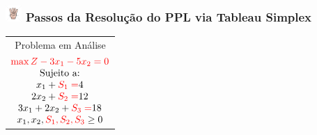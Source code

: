 \begin{frame}
	\frametitle{\includegraphics[width=0.6cm,height=0.6cm]{number_4.jpg} \hspace{0.2cm} Passos da Resolução do PPL via Tableau Simplex}
		
	\begin{table}
		\begin{tabular}{c}
			\cellcolor{yellow}Problema em Análise \\
			$
				\begin{matrix}
					\color{red} \max Z - 3x_1 - 5x_2 = 0 \\
					\text{Sujeito a:} \\
					x_1 + {\color{red}S_1 =} 4 \\
					2x_2 + {\color{red}S_2 =} 12 \\
					3x_1 + 2x_2 + {\color{red}S_3 =} 18 \\
					x_1, x_2,{\color{red} S_1, S_2, S_3} \ge 0 \\
				\end{matrix} 	
			$ 
		\end{tabular}
	\end{table}
		

\end{frame}
